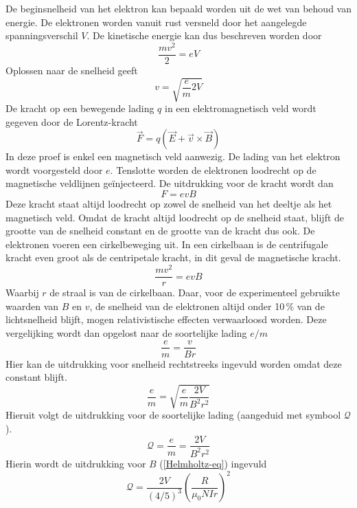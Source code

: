 De beginsnelheid van het elektron kan bepaald worden uit de wet van behoud van 
energie. De elektronen worden vanuit rust versneld door het aangelegde 
spanningsverschil $V$. De kinetische energie kan dus beschreven worden door
$$
\frac{mv^2}{2} = eV
$$
Oplossen naar de snelheid geeft
$$
v = \sqrt{ \frac{e}{m} 2V }
$$
De kracht op een bewegende lading $q$ in een elektromagnetisch veld wordt 
gegeven door de Lorentz-kracht
$$
\vec{F} = q(\vec{E} + \vec{v} \times \vec{B})
$$
In deze proef is enkel een magnetisch veld aanwezig. De lading van het elektron 
wordt voorgesteld door $e$. Tenslotte worden de elektronen loodrecht op de 
magnetische veldlijnen ge\"injecteerd. De uitdrukking voor de kracht wordt dan
$$
F = e v B
$$
Deze kracht staat altijd loodrecht op zowel de snelheid van het deeltje als het 
magnetisch veld. Omdat de kracht altijd loodrecht op de snelheid staat, blijft 
de grootte van de snelheid constant en de grootte van de kracht dus ook. De 
elektronen voeren een cirkelbeweging uit. In een cirkelbaan is de centrifugale 
kracht even groot als de centripetale kracht, in dit geval de magnetische 
kracht.
$$
\frac{mv^2}{r} = evB
$$
Waarbij $r$ de straal is van de cirkelbaan.
Daar, voor de experimenteel gebruikte waarden van $B$ en $v$, de snelheid 
van de elektronen altijd onder 10\,\% van de lichtsnelheid blijft, mogen 
relativistische effecten verwaarloosd worden. Deze vergelijking wordt dan
opgelost naar de soortelijke lading $e/m$
$$
\frac{e}{m} = \frac{v}{Br}
$$
Hier kan de uitdrukking voor snelheid rechtstreeks ingevuld worden omdat deze 
constant blijft.
$$
\frac{e}{m} = \sqrt{\frac{e}{m} \frac{2V}{B^2r^2}}
$$
Hieruit volgt de uitdrukking voor de soortelijke lading (aangeduid met 
symbool $\mathcal{Q}$).
$$
\mathcal{Q} = \frac{e}{m} = \frac{2V}{B^2r^2}
$$
Hierin wordt de uitdrukking voor $B$ (\ref{Helmholtz-eq}) ingevuld
\begin{equation}
\label{em-equation}
\mathcal{Q} = \frac{2V}{(4/5)^3} \left( \frac{R}{\mu_0NIr} \right)^2
\end{equation}
